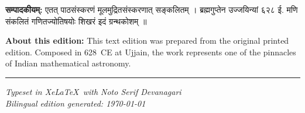\documentclass[11pt,a4paper]{article}
\providecommand{\XeLaTeX}{XeLaTeX}
\newcommand{\dev}[1]{{\devanagarifont\mdseries\upshape #1}}
\newcommand{\bilingualpair}[2]{%
  \noindent%
  \begin{minipage}[t]{0.47\textwidth}
    \begin{flushleft}
      \small\dev{#1}
    \end{flushleft}
  \end{minipage}%
  \hfill\vrule\hfill%
  \begin{minipage}[t]{0.47\textwidth}
    \begin{flushleft}
      \small #2
    \end{flushleft}
  \end{minipage}%
  \par\vspace{1.2ex}
}
\begin{document}
\vspace{1.5ex}

\bilingualpair{%
\textbf{सम्पादकीयम्:} एतत् पाठसंस्करणं मूलमुद्रितसंस्करणात् सङ्कलितम् । ब्रह्मगुप्तेन उज्जयिन्यां ६२८ ई. मणि संकलितं गणितज्योतिषयोः शिखरं इदं ग्रन्थकोशम् ॥
}{%
\textbf{About this edition:} This text edition was prepared from the original printed edition. Composed in 628~CE at Ujjain, the work represents one of the pinnacles of Indian mathematical astronomy.
}

\vspace{2ex}

\noindent\rule{\textwidth}{0.4pt}
\begin{center}
\small\textit{Typeset in \XeLaTeX\ with Noto Serif Devanagari\\
Bilingual edition generated: \today}
\end{center}
\end{document}

